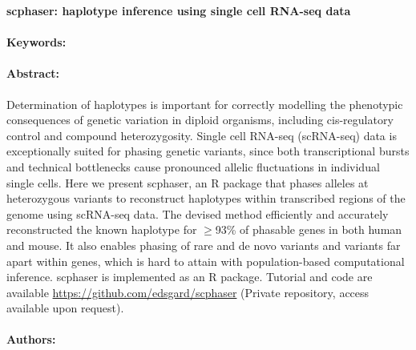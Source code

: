 \noindent
\large {\bf scphaser: haplotype inference using single cell RNA-seq data} 


\normalsize 


\noindent \paragraph{Keywords:} 

\noindent \paragraph{Abstract:} 

Determination of haplotypes is important for correctly modelling the phenotypic consequences of genetic
variation in diploid organisms, including cis-regulatory control and compound heterozygosity. Single cell
RNA-seq (scRNA-seq) data is exceptionally suited for phasing genetic variants, since both
transcriptional bursts and technical bottlenecks cause pronounced allelic fluctuations in individual single
cells. Here we present scphaser, an R package that phases alleles at heterozygous variants to
reconstruct haplotypes within transcribed regions of the genome using scRNA-seq data. The devised
method efficiently and accurately reconstructed the known haplotype for $\geq$93\% of phasable genes in
both human and mouse. It also enables phasing of rare and de novo variants and variants far apart
within genes, which is hard to attain with population-based computational inference. scphaser is
implemented as an R package. Tutorial and code are available
\url{https://github.com/edsgard/scphaser} (Private repository, access available upon request).

\noindent \paragraph{Authors:} 

